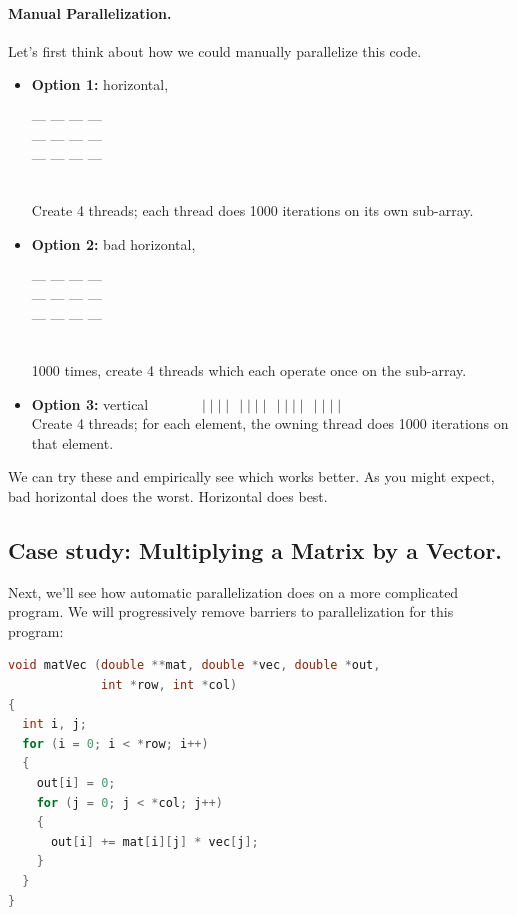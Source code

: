 \documentclass[a4paper]{report}
\begin{document}
\paragraph{Manual Parallelization.} Let's first think about how we could 
manually parallelize this code.
\begin{itemize}
\item {\bf Option 1:} horizontal, \begin{minipage}{7em} --- --- --- ---\\[-.8em] --- --- --- ---\\[-.8em] --- --- --- --- \end{minipage} \\
Create 4 threads; each thread does 1000 iterations on its own sub-array.

\item {\bf Option 2:} bad horizontal, \begin{minipage}{7em} --- --- --- ---\\[-.8em] --- --- --- ---\\[-.8em] --- --- --- --- \end{minipage} \\
1000 times, create 4 threads which each operate once on the sub-array.

\item {\bf Option 3:} vertical $ \quad \: \qquad \mid \mid \mid\mid \:\: \mid \mid \mid \mid \:\: \mid \mid \mid \mid\:\: \mid \mid \mid \mid$\\
Create 4 threads; for each element, the owning thread does 1000 iterations on that element.
\end{itemize}
We can try these and empirically see which works better. As you might expect, bad horizontal
does the worst. Horizontal does best.

\subsection*{Case study: Multiplying a Matrix by a Vector.}
Next, we'll see how automatic parallelization does on a more complicated
program. We will progressively remove barriers to parallelization for
this program:
\begin{lstlisting}[language=C]
void matVec (double **mat, double *vec, double *out,
             int *row, int *col) 
{
  int i, j;
  for (i = 0; i < *row; i++)
  {
    out[i] = 0;
    for (j = 0; j < *col; j++)
    {
      out[i] += mat[i][j] * vec[j];
    }
  }
}
\end{lstlisting}
\end{document}
